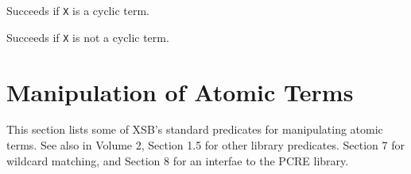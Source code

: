 \begin{description}
    Succeeds if {\tt X} is a cyclic term.  
\end{description}

\begin{description}
    Succeeds if {\tt X} is not a cyclic term.  
\end{description}

\section{Manipulation of Atomic Terms}

This section lists some of XSB's standard predicates for manipulating
atomic terms.  See also in Volume 2, Section 1.5 for other library
predicates. Section 7 for wildcard matching, and Section 8 for an
interfae to the PCRE library.

